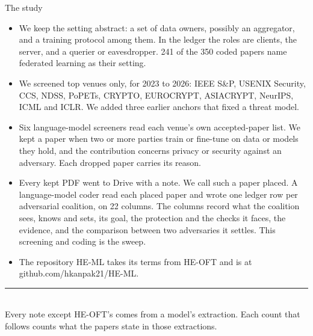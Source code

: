 \documentclass[aspectratio=169,10pt]{beamer}
\newcommand{\redline}{\textcolor{kred}{\rule{\textwidth}{1pt}}}
\begin{document}
\begin{frame}{The study}
  \small
  \begin{itemize}
    \item We keep the setting abstract: a set of data owners, possibly an aggregator, and a training protocol among them. In the ledger the roles are clients, the server, and a querier or eavesdropper. 241 of the 350 coded papers name federated learning as their setting.
    \item We screened top venues only, for 2023 to 2026: IEEE S\&P, USENIX Security, CCS, NDSS, PoPETs, CRYPTO, EUROCRYPT, ASIACRYPT, NeurIPS, ICML and ICLR. We added three earlier anchors that fixed a threat model.
    \item Six language-model screeners read each venue's own accepted-paper list. We kept a paper when two or more parties train or fine-tune on data or models they hold, and the contribution concerns privacy or security against an adversary. Each dropped paper carries its reason.
    \item Every kept PDF went to Drive with a note. We call such a paper placed. A language-model coder read each placed paper and wrote one ledger row per adversarial coalition, on 22 columns. The columns record what the coalition sees, knows and sets, its goal, the protection and the checks it faces, the evidence, and the comparison between two adversaries it settles. This screening and coding is the sweep.
    \item The repository HE-ML takes its terms from HE-OFT and is at github.com/hkanpak21/HE-ML.
  \end{itemize}
  \vspace{0.3em}
  \redline\\[0.3em]
  Every note except HE-OFT's comes from a model's extraction. Each count that follows counts what the papers state in those extractions.
\end{frame}
\end{document}
